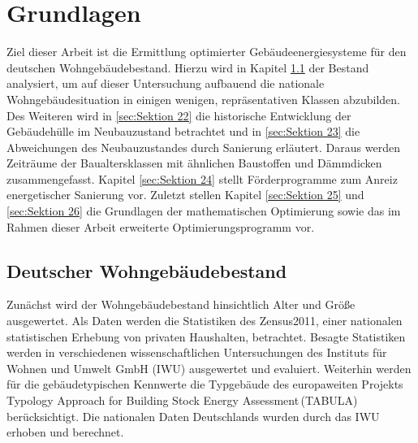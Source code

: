 \chapter{Grundlagen}

Ziel dieser Arbeit ist die Ermittlung optimierter Gebäudeenergiesysteme für den deutschen Wohngebäudebestand.
Hierzu wird in Kapitel \ref{sec:Sektion 21} der Bestand analysiert, um auf dieser Untersuchung aufbauend die nationale Wohngebäudesituation in einigen wenigen, repräsentativen Klassen abzubilden. 
Des Weiteren wird in \ref{sec:Sektion 22} die historische Entwicklung der Gebäudehülle im Neubauzustand betrachtet und in \ref{sec:Sektion 23} die Abweichungen des Neubauzustandes durch Sanierung erläutert. Daraus werden Zeiträume der Baualtersklassen mit ähnlichen Baustoffen und Dämmdicken zusammengefasst. 
Kapitel \ref{sec:Sektion 24} stellt Förderprogramme zum Anreiz energetischer Sanierung vor.
Zuletzt stellen Kapitel \ref{sec:Sektion 25} und \ref{sec:Sektion 26} die Grundlagen der mathematischen Optimierung sowie das im Rahmen dieser Arbeit erweiterte Optimierungsprogramm vor. 




\section{Deutscher Wohngebäudebestand}
\label{sec:Sektion 21}

Zunächst wird der Wohngebäudebestand hinsichtlich Alter und Größe ausgewertet.
Als Daten werden die Statistiken des Zensus2011, einer nationalen statistischen Erhebung von privaten Haushalten, betrachtet. 
Besagte Statistiken werden in verschiedenen wissenschaftlichen Untersuchungen des Instituts für Wohnen und Umwelt GmbH (IWU) ausgewertet und evaluiert.
Weiterhin werden für die gebäudetypischen Kennwerte die Typgebäude des europaweiten Projekts \glqq Typology Approach for Building Stock Energy Assessment\grqq\,(TABULA) berücksichtigt. Die nationalen Daten Deutschlands wurden durch das IWU erhoben und berechnet.

